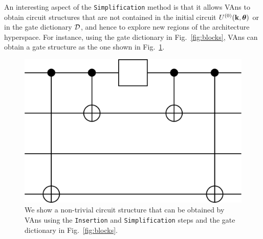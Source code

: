 An interesting aspect of the \texttt{Simplification} method is that it allows VAns to obtain circuit structures that are not contained in the initial circuit $U^{(0)}(\mathbf{k},\bm{\theta})$ or in the gate dictionary $\mathcal{D}$, and hence to explore new regions of the architecture hyperspace. For instance, using the gate dictionary in Fig.~\ref{fig:blocks}, VAns can obtain a gate structure as the one shown in Fig.~\ref{fig:new}.

\begin{figure}[t!]
\centering
\includegraphics[width=.5\textwidth]{Figures/VANS/Fig5.pdf}
\caption{We show a non-trivial circuit structure that can be obtained by VAns using the \texttt{Insertion} and \texttt{Simplification} steps and the gate dictionary in Fig.~\ref{fig:blocks}. }
\label{fig:new}
\end{figure}
\afterpage{\clearpage}

